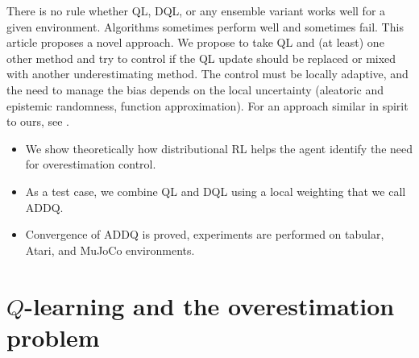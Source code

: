 \documentclass{article}
\theoremstyle{plain}
\theoremstyle{definition}
\theoremstyle{remark}
\begin{document}
There is no rule whether QL, DQL, or any ensemble variant works well for a given environment. Algorithms sometimes perform well and sometimes fail. This article proposes a novel approach. We propose to take QL and (at least) one other method and try to control if the QL update should be replaced or mixed with another underestimating method. The control must be locally adaptive, and the need to manage the bias depends on the local uncertainty (aleatoric and epistemic randomness, function approximation). For an approach similar in spirit to ours, see \cite{Dorka}.
\begin{itemize}
    \item We show theoretically how distributional RL helps the agent identify the need for overestimation control.
    \item As a test case, we combine QL and DQL using a local weighting that we call ADDQ.
    \item Convergence of ADDQ is proved, experiments are performed on tabular, Atari, and MuJoCo environments.
\end{itemize}



\section{$Q$-learning and the overestimation problem}
\end{document}
